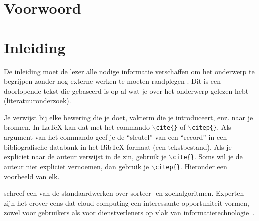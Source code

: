 \documentclass[pdftex,a4paper,12pt,twoside]{report}
\begin{document}
\begin{abstract}
  \lipsum[1-4]
\end{abstract}

\chapter*{Voorwoord}
\label{ch:voorwoord}

\lipsum[5-6]

\tableofcontents



\chapter{Inleiding}
\label{ch:inleiding}

De inleiding moet de lezer alle nodige informatie verschaffen om het onderwerp te begrijpen zonder nog externe werken te moeten raadplegen \citep{Pollefliet2011}. Dit is een doorlopende tekst die gebaseerd is op al wat je over het onderwerp gelezen hebt (literatuuronderzoek).

Je verwijst bij elke bewering die je doet, vakterm die je introduceert, enz. naar je bronnen. In \LaTeX{} kan dat met het commando \texttt{$\backslash${cite\{\}}} of \texttt{$\backslash${citep\{\}}}. Als argument van het commando geef je de ``sleutel'' van een ``record'' in een bibliografische databank in het Bib\TeX{}-formaat (een tekstbestand). Als je expliciet naar de auteur verwijst in de zin, gebruik je \texttt{$\backslash${}cite\{\}}.
Soms wil je de auteur niet expliciet vernoemen, dan gebruik je \texttt{$\backslash${}citep\{\}}. Hieronder een voorbeeld van elk.

\cite{Knuth1998} schreef een van de standaardwerken over sorteer- en zoekalgoritmen. Experten zijn het erover eens dat cloud computing een interessante opportuniteit vormen, zowel voor gebruikers als voor dienstverleners op vlak van informatietechnologie~\citep{Creeger2009}.
\end{document}
